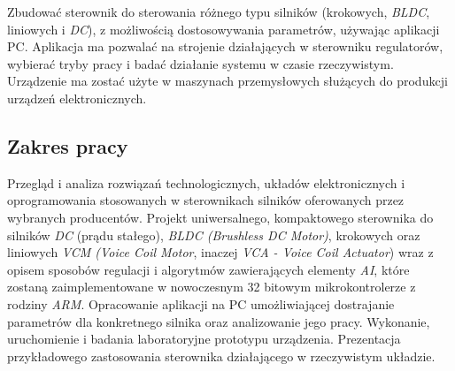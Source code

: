Zbudować sterownik do sterowania różnego typu silników (krokowych, {\it BLDC}, liniowych i {\it DC}), z możliwością dostosowywania parametrów, używając aplikacji PC. Aplikacja ma pozwalać na strojenie działających w sterowniku regulatorów, wybierać tryby pracy i badać działanie systemu w czasie rzeczywistym. Urządzenie ma zostać użyte w maszynach przemysłowych służących do produkcji urządzeń elektronicznych.

\subsection*{Zakres pracy}

Przegląd i analiza rozwiązań technologicznych, układów elektronicznych i oprogramowania stosowanych w sterownikach silników oferowanych przez wybranych producentów. Projekt uniwersalnego, kompaktowego sterownika do silników {\it DC} (prądu stałego), {\it BLDC (Brushless DC Motor)}, krokowych oraz liniowych {\it VCM (Voice Coil Motor}, inaczej {\it VCA - Voice Coil Actuator}) wraz z opisem sposobów regulacji i algorytmów zawierających elementy {\it AI}, które zostaną zaimplementowane w nowoczesnym 32 bitowym mikrokontrolerze z rodziny {\it ARM}. Opracowanie aplikacji na PC umożliwiającej dostrajanie parametrów dla konkretnego silnika oraz analizowanie jego pracy. Wykonanie, uruchomienie i badania laboratoryjne prototypu urządzenia. Prezentacja przykładowego zastosowania sterownika działającego w rzeczywistym układzie.

\clearpage
